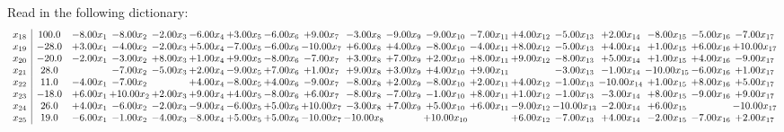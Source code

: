 \documentclass[9pt]{article}
\begin{document}
Read in the following dictionary:
\[\begin{array}{c| c c@{\hskip 2pt} c@{\hskip 2pt} c@{\hskip 2pt} c@{\hskip 2pt} c@{\hskip 2pt} c@{\hskip 2pt} c@{\hskip 2pt} c@{\hskip 2pt} c@{\hskip 2pt} c@{\hskip 2pt} c@{\hskip 2pt} c@{\hskip 2pt} c@{\hskip 2pt} c@{\hskip 2pt} c@{\hskip 2pt} c@{\hskip 2pt} c@{\hskip 2pt} }
 x_{18}   &  100.0 & -8.00 x_{1} & -8.00 x_{2} & -2.00 x_{3} & -6.00 x_{4} & +  3.00 x_{5} & -6.00 x_{6} & +  9.00 x_{7} & -3.00 x_{8} & -9.00 x_{9} & -9.00 x_{10} & -7.00 x_{11} & +  4.00 x_{12} & -5.00 x_{13} & +  2.00 x_{14} & -8.00 x_{15} & -5.00 x_{16} & -7.00 x_{17}\\
 x_{19}   &  -28.0 & +  3.00 x_{1} & -4.00 x_{2} & -2.00 x_{3} & +  5.00 x_{4} & -7.00 x_{5} & -6.00 x_{6} & -10.00 x_{7} & +  6.00 x_{8} & +  4.00 x_{9} & -8.00 x_{10} & -4.00 x_{11} & +  8.00 x_{12} & -5.00 x_{13} & +  4.00 x_{14} & +  1.00 x_{15} & +  6.00 x_{16} & + 10.00 x_{17}\\
 x_{20}   &  -20.0 & -2.00 x_{1} & -3.00 x_{2} & +  8.00 x_{3} & +  1.00 x_{4} & +  9.00 x_{5} & -8.00 x_{6} & -7.00 x_{7} & +  3.00 x_{8} & +  7.00 x_{9} & +  2.00 x_{10} & +  8.00 x_{11} & +  9.00 x_{12} & -8.00 x_{13} & +  5.00 x_{14} & +  1.00 x_{15} & +  4.00 x_{16} & -9.00 x_{17}\\
 x_{21}   &  28.0  &   & -7.00 x_{2} & -5.00 x_{3} & +  2.00 x_{4} & -9.00 x_{5} & +  7.00 x_{6} & +  1.00 x_{7} & +  9.00 x_{8} & +  3.00 x_{9} & +  4.00 x_{10} & +  9.00 x_{11} &   & -3.00 x_{13} & -1.00 x_{14} & -10.00 x_{15} & -6.00 x_{16} & +  1.00 x_{17}\\
 x_{22}   &  11.0 & -4.00 x_{1} & -7.00 x_{2} &   & +  4.00 x_{4} & -8.00 x_{5} & +  4.00 x_{6} & -9.00 x_{7} & -8.00 x_{8} & +  2.00 x_{9} & -8.00 x_{10} & +  2.00 x_{11} & +  4.00 x_{12} & -1.00 x_{13} & -10.00 x_{14} & +  1.00 x_{15} & +  8.00 x_{16} & +  5.00 x_{17}\\
 x_{23}   &  -18.0 & +  6.00 x_{1} & + 10.00 x_{2} & +  2.00 x_{3} & +  9.00 x_{4} & +  4.00 x_{5} & -8.00 x_{6} & +  6.00 x_{7} & -8.00 x_{8} & -7.00 x_{9} & -1.00 x_{10} & +  8.00 x_{11} & +  1.00 x_{12} & -1.00 x_{13} & -3.00 x_{14} & +  8.00 x_{15} & -9.00 x_{16} & +  9.00 x_{17}\\
 x_{24}   &  26.0 & +  4.00 x_{1} & -6.00 x_{2} & -2.00 x_{3} & -9.00 x_{4} & -6.00 x_{5} & +  5.00 x_{6} & + 10.00 x_{7} & -3.00 x_{8} & +  7.00 x_{9} & +  5.00 x_{10} & +  6.00 x_{11} & -9.00 x_{12} & -10.00 x_{13} & -2.00 x_{14} & +  6.00 x_{15} &   & -10.00 x_{17}\\
 x_{25}   &  19.0 & -6.00 x_{1} & -1.00 x_{2} & -4.00 x_{3} & -8.00 x_{4} & +  5.00 x_{5} & +  5.00 x_{6} & -10.00 x_{7} & -10.00 x_{8} &   & + 10.00 x_{10} &   & +  6.00 x_{12} & -7.00 x_{13} & +  4.00 x_{14} & -2.00 x_{15} & -7.00 x_{16} & +  2.00 x_{17}\\

\end{array}\]
\end{document}
